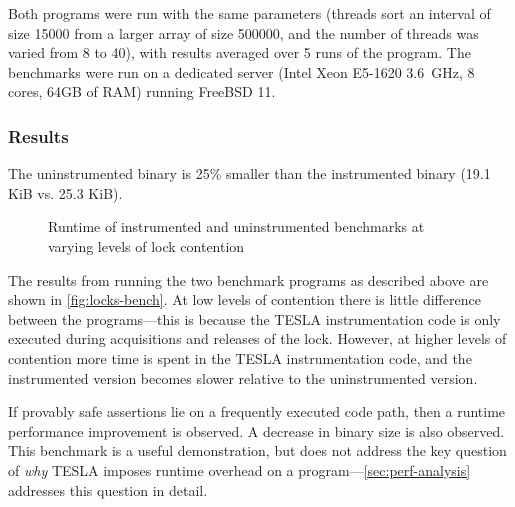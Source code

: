Both programs were run with the same parameters (threads sort an interval of
size \num{15000} from a larger array of size \num{500000}, and the number of
threads was varied from 8 to 40), with results averaged over 5 runs of the
program. The benchmarks were run on a dedicated server (Intel Xeon E5-1620
\SI{3.6}{\GHz}, 8 cores, 64GB of RAM) running FreeBSD 11.

\subsubsection{Results}

The uninstrumented binary is 25\% smaller than the instrumented binary
(\num{19.1} KiB vs. \num{25.3} KiB).

\begin{figure}
  \centering
  \caption{Runtime of instrumented and uninstrumented benchmarks at
  varying levels of lock contention}
  \label{fig:locks-bench}
\end{figure}

The results from running the two benchmark programs as described above are shown
in \autoref{fig:locks-bench}. At low levels of contention there is little
difference between the programs---this is because the TESLA instrumentation code
is only executed during acquisitions and releases of the lock. However, at
higher levels of contention more time is spent in the TESLA instrumentation
code, and the instrumented version becomes slower relative to the uninstrumented
version.

If provably safe assertions lie on a frequently executed code path, then
a runtime performance improvement is observed. A decrease in binary size
is also observed. This benchmark is a useful demonstration, but does not address
the key question of \emph{why} TESLA imposes runtime overhead on a
program---\autoref{sec:perf-analysis} addresses this question in detail.

